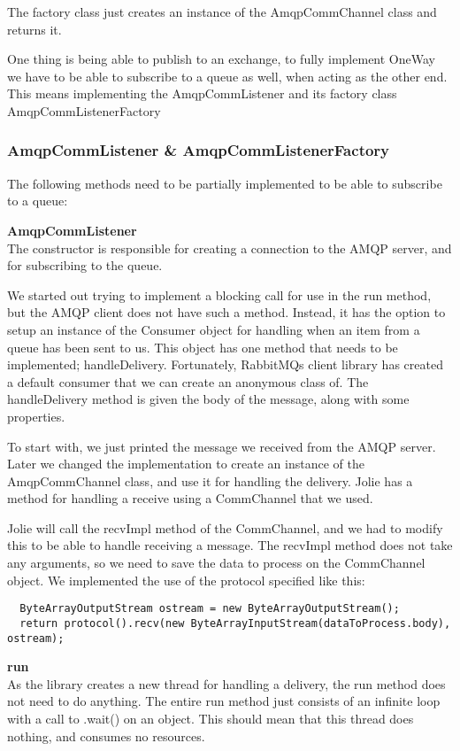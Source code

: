 The factory class just creates an instance of the AmqpCommChannel class and returns it.

One thing is being able to publish to an exchange, to fully implement OneWay we have to be able to subscribe to a queue as well, when acting as the other end. This means implementing the AmqpCommListener and its factory class AmqpCommListenerFactory

\subsubsection{AmqpCommListener \& AmqpCommListenerFactory}
The following methods need to be partially implemented to be able to subscribe to a queue:

\noindent\textbf{AmqpCommListener}\\
The constructor is responsible for creating a connection to the AMQP server, and for subscribing to the queue.

We started out trying to implement a blocking call for use in the run method, but the AMQP client does not have such a method. Instead, it has the option to setup an instance of the Consumer object for handling when an item from a queue has been sent to us. This object has one method that needs to be implemented; handleDelivery. Fortunately, RabbitMQs client library has created a default consumer that we can create an anonymous class of. The handleDelivery method is given the body of the message, along with some properties.

To start with, we just printed the message we received from the AMQP server. Later we changed the implementation to create an instance of the AmqpCommChannel class, and use it for handling the delivery. Jolie has a method for handling a receive using a CommChannel that we used.

Jolie will call the recvImpl method of the CommChannel, and we had to modify this to be able to handle receiving a message. The recvImpl method does not take any arguments, so we need to save the data to process on the CommChannel object. We implemented the use of the protocol specified like this:
\begin{lstlisting}
  ByteArrayOutputStream ostream = new ByteArrayOutputStream();
  return protocol().recv(new ByteArrayInputStream(dataToProcess.body), ostream);
\end{lstlisting}

\noindent\textbf{run}\\
As the library creates a new thread for handling a delivery, the run method does not need to do anything. The entire run method just consists of an infinite loop with a call to .wait() on an object. This should mean that this thread does nothing, and consumes no resources.

